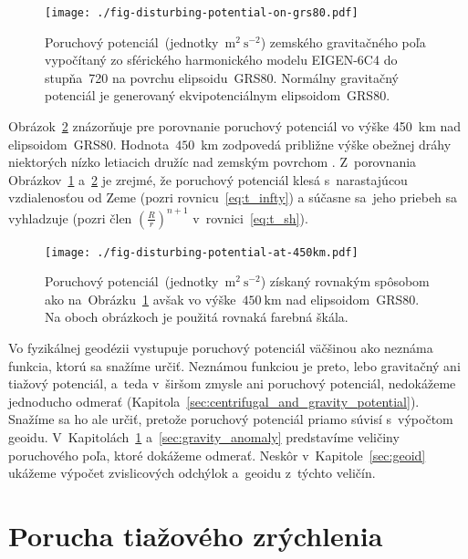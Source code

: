 \documentclass[a4paper, 12pt]{book}
\begin{document}
\begin{figure}
\centering
\texttt{[image: ./fig-disturbing-potential-on-grs80.pdf]}
\caption{Poruchový potenciál~(jednotky~$\mathrm{m}^2 \ \mathrm{s}^{-2}$) 
zemského gravitačného poľa vypočítaný zo sférického harmonického modelu 
EIGEN-6C4 do stupňa~720 na povrchu elipsoidu~GRS80.  Normálny gravitačný 
potenciál je generovaný ekvipotenciálnym elipsoidom~GRS80.}
\label{fig:disturbing_potential_on_grs80}
\end{figure}

Obrázok~\ref{fig:disturbing_potential_at_450km} znázorňuje pre porovnanie 
poruchový potenciál vo výške 450~km nad elipsoidom~GRS80.  Hodnota~$450$~km 
zodpovedá približne výške obežnej dráhy niektorých nízko letiacich družíc nad 
zemským povrchom \parencite[pozri napríklad][]{MoritzPhysicalGeodesy}.  
Z~porovnania Obrázkov~\ref{fig:disturbing_potential_on_grs80} 
a~\ref{fig:disturbing_potential_at_450km} je zrejmé, že poruchový potenciál 
klesá s~narastajúcou vzdialenosťou od Zeme (pozri rovnicu~\ref{eq:t_infty}) 
a súčasne sa~jeho priebeh sa vyhladzuje (pozri člen $\left( \frac{R}{r} 
\right)^{n + 1}$ v~rovnici~\ref{eq:t_sh}).

\begin{figure}
\centering
\texttt{[image: ./fig-disturbing-potential-at-450km.pdf]}
\caption{Poruchový potenciál~(jednotky~$\mathrm{m}^2 \ \mathrm{s}^{-2}$) 
získaný rovnakým spôsobom ako 
na~Obrázku~\ref{fig:disturbing_potential_on_grs80} avšak vo výške~$450\ 
\mathrm{km}$ nad elipsoidom~GRS80.  Na oboch obrázkoch je použitá rovnaká 
farebná škála.}
\label{fig:disturbing_potential_at_450km}
\end{figure}

Vo fyzikálnej geodézii vystupuje poruchový potenciál väčšinou ako neznáma 
funkcia, ktorú sa snažíme určiť.  Neznámou funkciou je preto, lebo gravitačný 
ani tiažový potenciál, a~teda v~širšom zmysle ani poruchový potenciál, 
nedokážeme jednoducho odmerať 
(Kapitola~\ref{sec:centrifugal_and_gravity_potential}).  Snažíme sa ho ale 
určiť, pretože poruchový potenciál priamo súvisí s~výpočtom geoidu.  
V~Kapitolách~\ref{sec:gravity_disturbance} a~\ref{sec:gravity_anomaly} 
predstavíme veličiny poruchového poľa, ktoré dokážeme odmerať.  Neskôr 
v~Kapitole~\ref{sec:geoid} ukážeme výpočet zvislicových odchýlok a~geoidu 
z~týchto veličín.





\section{Porucha tiažového zrýchlenia}
\label{sec:gravity_disturbance}
\end{document}
